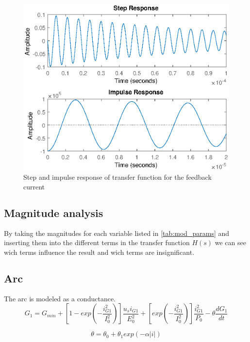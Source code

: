 \begin{figure}
    \centering
    \includegraphics[width=\textwidth]{img/FeedbackResponse.eps}
    \caption{Step and impulse response of transfer function for the feedback current}
    \label{fig:my_label}
\end{figure}

\subsection{Magnitude analysis}
By taking the magnitudes for each variable listed in \cref{tab:mod_params} and inserting them into the different terms in the transfer function $H(s)$ we can see wich terms influence the result and wich terms are insignificant.

\subsection{Arc}
The arc is modeled as a conductance.
\begin{equation} \label{eq:g1}
    G_1 = G_{min} + [ 1 - exp(-\frac{i_{G1}^2}{I_0^2})] \frac{u_s i_{G1}}{E_0^2} + [exp(-\frac{i_{G1}^2}{I_0^2})] \frac{i_{G1}^2}{P_0} - \theta \frac{d G_1}{dt}
\end{equation}

\begin{equation}
    \theta = \theta_0 + \theta_1 exp(-\alpha |i|)
\end{equation}

